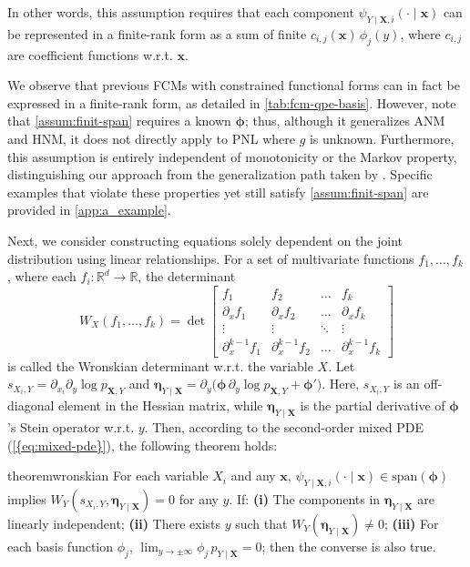 \documentclass{article}
\theoremstyle{plain}
\theoremstyle{definition}
\theoremstyle{remark}
\newcommand{\rebuttalmodify}[1]{\todo[size=\scriptsize, color=cyan!30]{#1}}%
\begin{document}
In other words, this assumption requires that each component $\psi_{Y\mid\bm{X},i}(\cdot\!\mid\!\bm{x})$ can be represented in a finite-rank form as a sum of finite $c_{i,j}(\bm{x})\,\phi_j(y)$, where $c_{i,j}$ are coefficient functions w.r.t. $\bm{x}$.

We observe that previous FCMs with constrained functional forms can in fact be expressed in a finite-rank form, as detailed in \cref{tab:fcm-qpe-basis}. However, note that \cref{assum:finit-span} requires a known $\bm{\phi}$; thus, although it generalizes ANM and HNM, it does not directly apply to PNL where $g$ is unknown. Furthermore, this assumption is entirely independent of monotonicity or the Markov property, distinguishing our approach from the generalization path taken by \citet{Xi2025}. Specific examples that violate these properties yet still satisfy \cref{assum:finit-span} are provided in \cref{app:a_example}.\rebuttalmodify{Modified in response to ``W1w7:Q1''}

Next, we consider constructing equations solely dependent on the joint distribution using linear relationships. For a set of multivariate functions $f_1,\dots,f_k$, where each $f_i:\mathbb{R}^d\to\mathbb{R}$, the determinant
\[W_X(f_1,\dots,f_k)=\det\left[\begin{array}{cccc}f_1&f_2&\dots&f_k\\\partial_xf_1&\partial_xf_2&\dots&\partial_xf_k\\\vdots&\vdots&\ddots&\vdots\\\partial^{k-1}_xf_1&\partial^{k-1}_xf_2&\dots&\partial^{k-1}_xf_k\end{array}\right]\]
is called the Wronskian determinant w.r.t. the variable $X$. Let $s_{X_i,Y}=\partial_{x_i}\partial_y\log p_{\bm{X},Y}$ and $\bm{\eta}_{Y\mid\bm{X}}=\partial_y\big(\bm{\phi}\,\partial_y\log p_{\bm{X},Y}+\bm{\phi}'\big)$. Here, $s_{X_i,Y}$ is an off-diagonal element in the Hessian matrix, while $\bm{\eta}_{Y\mid\bm{X}}$ is the partial derivative of $\bm{\phi}$'s Stein operator w.r.t. $y$. Then, according to the second-order mixed PDE (\cref{{eq:mixed-pde}}), the following theorem holds:

\begin{restatable}{theorem}{wronskian}
\label{thm:wronskian}
For each variable $X_i$ and any $\bm{x}$, $\psi_{Y\mid\bm{X},i}(\cdot\!\mid\!\bm{x})\in\text{span}(\bm{\phi})$ implies $W_Y(s_{X_i,Y},\bm{\eta}_{Y\mid\bm{X}})=0$ for any $y$. If: \textbf{(i)} The components in $\bm{\eta}_{Y\mid\bm{X}}$ are linearly independent; \textbf{(ii)} There exists $y$ such that $W_Y(\bm{\eta}_{Y\mid\bm{X}})\ne 0$; \textbf{(iii)} For each basis function $\phi_j$, $\lim_{y\to\pm\infty}\phi_j\,p_{Y\mid\bm{X}}=0$;
then the converse is also true.
\end{restatable}
\end{document}
